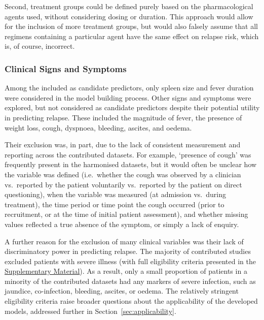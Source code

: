 Second, treatment groups could be defined purely based on the pharmacological agents used, without considering dosing or duration. This approach would allow for the inclusion of more treatment groups, but would also falsely assume that all regimens containing a particular agent have the same effect on relapse risk, which is, of course, incorrect.

\subsubsection{Clinical Signs and Symptoms}

Among the  included as candidate predictors, only spleen size and fever duration were considered in the model building process. Other signs and symptoms were explored, but not considered as candidate predictors despite their potential utility in predicting relapse. These included the magnitude of fever, the presence of weight loss, cough, dyspnoea, bleeding, ascites, and oedema.

Their exclusion was, in part, due to the lack of consistent measurement and reporting across the contributed datasets. For example, `presence of cough' was frequently present in the harmonised datasets, but it would often be unclear how the variable was defined (i.e.\ whether the cough was observed by a clinician vs.\ reported by the patient voluntarily vs.\ reported by the patient on direct questioning), when the variable was measured (at admission vs.\ during treatment), the time period or time point the cough occurred (prior to recruitment, or at the time of initial patient assessment), and whether missing values reflected a true absence of the symptom, or simply a lack of enquiry.

A further reason for the exclusion of many clinical variables was their lack of discriminatory power in predicting relapse. The majority of contributed studies excluded patients with severe illness (with full eligibility criteria presented in the \href{https://github.com/jpwil/dphil}{Supplementary Material}). As a result, only a small proportion of patients in a minority of the contributed datasets had any markers of severe infection, such as jaundice, co-infection, bleeding, ascites, or oedema. The relatively stringent eligibility criteria raise broader questions about the applicability of the developed models, addressed further in Section~\ref{sec:applicability}.

